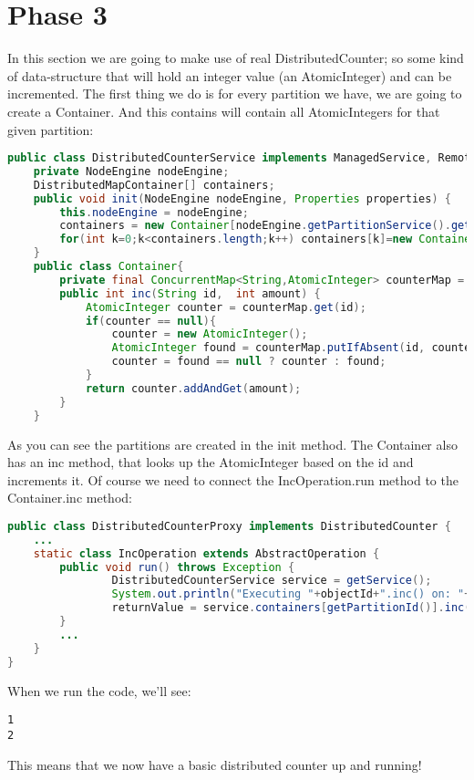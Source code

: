 \section{Phase 3}
In this section we are going to make use of real DistributedCounter; so some kind of data-structure that will hold an integer value (an AtomicInteger) and can be incremented. The first thing we do is for every partition we have, we are going to create a Container. And this contains will contain all AtomicIntegers for that given partition:
\begin{lstlisting}[language=java]
public class DistributedCounterService implements ManagedService, RemoteService {
    private NodeEngine nodeEngine;
    DistributedMapContainer[] containers;
    public void init(NodeEngine nodeEngine, Properties properties) {
        this.nodeEngine = nodeEngine;
        containers = new Container[nodeEngine.getPartitionService().getPartitionCount()];
        for(int k=0;k<containers.length;k++) containers[k]=new Container();
    }
    public class Container{
        private final ConcurrentMap<String,AtomicInteger> counterMap = new ConcurrentHashMap<>();
        public int inc(String id,  int amount) {
            AtomicInteger counter = counterMap.get(id);
            if(counter == null){
                counter = new AtomicInteger();
                AtomicInteger found = counterMap.putIfAbsent(id, counter);
                counter = found == null ? counter : found;
            }
            return counter.addAndGet(amount);
        }
    }
\end{lstlisting}
As you can see the partitions are created in the init method. The Container also has an inc method, that looks up the AtomicInteger based on the id and increments it. Of course we need to connect the IncOperation.run method to the Container.inc method:
\begin{lstlisting}[language=java]
public class DistributedCounterProxy implements DistributedCounter {
    ... 
    static class IncOperation extends AbstractOperation {
        public void run() throws Exception {
                DistributedCounterService service = getService();
                System.out.println("Executing "+objectId+".inc() on: "+getNodeEngine().getThisAddress());
                returnValue = service.containers[getPartitionId()].inc(objectId, amount);
        }
        ...
    }
}
\end{lstlisting}
When we run the code, we'll see:
\begin{lstlisting}
1
2
\end{lstlisting}
This means that we now have a basic distributed counter up and running!

